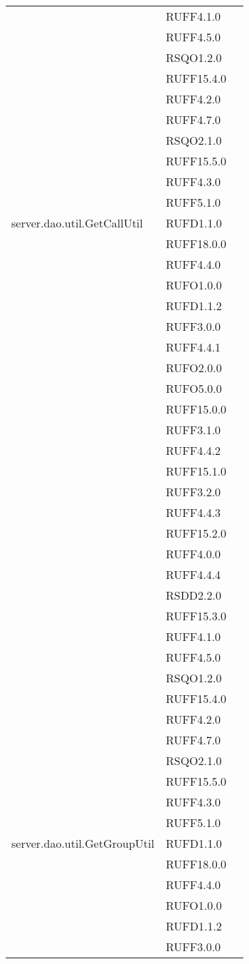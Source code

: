 \begin{center}
\begin{longtable}{lp{}l}
 & RUFF4.1.0 \\
 & RUFF4.5.0 \\
 & RSQO1.2.0 \\
 & RUFF15.4.0 \\
 & RUFF4.2.0 \\
 & RUFF4.7.0 \\
 & RSQO2.1.0 \\
 & RUFF15.5.0 \\
 & RUFF4.3.0 \\
 & RUFF5.1.0 \\
server.dao.util.GetCallUtil & RUFD1.1.0 \\
 & RUFF18.0.0 \\
 & RUFF4.4.0 \\
 & RUFO1.0.0 \\
 & RUFD1.1.2 \\
 & RUFF3.0.0 \\
 & RUFF4.4.1 \\
 & RUFO2.0.0 \\
 & RUFO5.0.0 \\
 & RUFF15.0.0 \\
 & RUFF3.1.0 \\
 & RUFF4.4.2 \\
 & RUFF15.1.0 \\
 & RUFF3.2.0 \\
 & RUFF4.4.3 \\
 & RUFF15.2.0 \\
 & RUFF4.0.0 \\
 & RUFF4.4.4 \\
 & RSDD2.2.0 \\
 & RUFF15.3.0 \\
 & RUFF4.1.0 \\
 & RUFF4.5.0 \\
 & RSQO1.2.0 \\
 & RUFF15.4.0 \\
 & RUFF4.2.0 \\
 & RUFF4.7.0 \\
 & RSQO2.1.0 \\
 & RUFF15.5.0 \\
 & RUFF4.3.0 \\
 & RUFF5.1.0 \\
server.dao.util.GetGroupUtil & RUFD1.1.0 \\
 & RUFF18.0.0 \\
 & RUFF4.4.0 \\
 & RUFO1.0.0 \\
 & RUFD1.1.2 \\
 & RUFF3.0.0 \\

\end{longtable}
\end{center}
